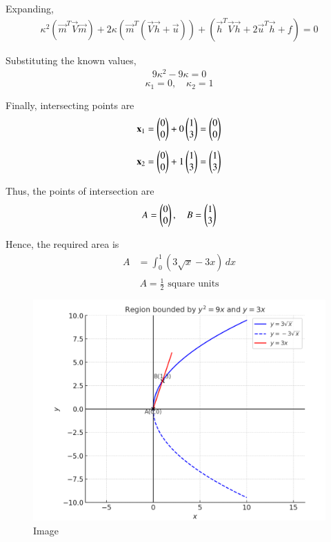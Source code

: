 \documentclass[journal]{IEEEtran}
\begin{document}
Expanding,
\begin{align}
\kappa^2 (\vec{m}^T\vec{V}\vec{m}) + 2\kappa(\vec{m}^T(\vec{V}\vec{h} + \vec{u})) + (\vec{h}^T\vec{V}\vec{h} + 2\vec{u}^T\vec{h} + f) = 0
\end{align}

Substituting the known values,
\begin{align}
9\kappa^2 - 9\kappa = 0
\end{align}
\[
\kappa_1 = 0, \quad \kappa_2 = 1
\]

\noindent
Finally, intersecting points are
\begin{align}
\mathbf{x}_1 &= \begin{pmatrix}0 \\ 0\end{pmatrix} + 0\begin{pmatrix}1 \\ 3\end{pmatrix} = \begin{pmatrix}0 \\ 0\end{pmatrix} \\[2mm]
\mathbf{x}_2 &= \begin{pmatrix}0 \\ 0\end{pmatrix} + 1\begin{pmatrix}1 \\ 3\end{pmatrix} = \begin{pmatrix}1 \\ 3\end{pmatrix}
\end{align}

\noindent
Thus, the points of intersection are 
\[
A = \begin{pmatrix}0 \\ 0\end{pmatrix}, \quad B = \begin{pmatrix}1 \\ 3\end{pmatrix}
\]
 
Hence, the required area is
\begin{align}
A &= \int_{0}^{1} (3\sqrt{x} - 3x)\,dx \\[2mm]
\end{align}
\[
\boxed{A = \tfrac{1}{2} \text{ square units}}
\]

\begin{figure}[H]
    \centering
    \includegraphics[width=0.85\linewidth]{figs/image.png}
    \caption{Image}
    \label{fig:placeholder}
\end{figure}
\end{document}
